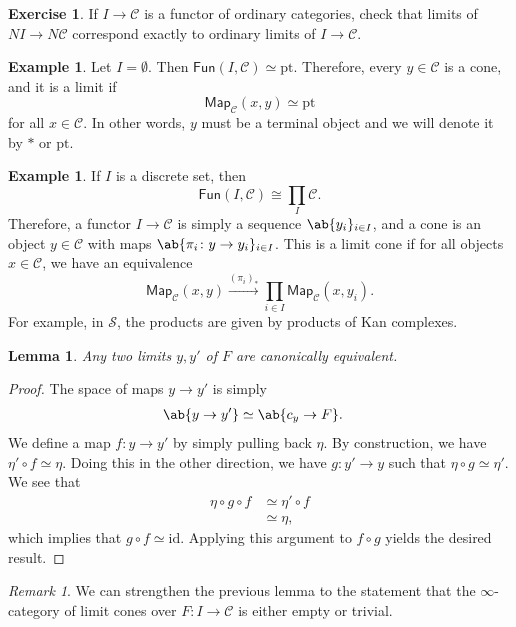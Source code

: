 \documentclass[10pt, oneside]{memoir}
\newtheorem{lem}[thm]{Lemma}
\theoremstyle{definition}
\newtheorem{exm}[thm]{Example}
\newtheorem{exer}[thm]{Exercise}
\theoremstyle{remark}
\newtheorem{rmk}[thm]{Remark}
\theoremstyle{plain}
\theoremstyle{definition}
\theoremstyle{remark}
\newcommand{\mc}[1]{\mathcal{#1}}
\newcommand{\mr}[1]{\mathrm{#1}}
\newcommand{\ms}[1]{\mathsf{#1}}
\newcommand{\1}{\mathbf{1}}
\newcommand{\2}{\mathbf{2}}
\newcommand{\3}{\mathbf{3}}
\begin{document}
\begin{exer}
    If $I \to \mc{C}$ is a functor of ordinary categories, check that limits of $NI \to N \mc{C}$ correspond exactly to ordinary limits of $I \to \mc{C}$.
\end{exer}

\begin{exm}
    Let $I = \emptyset$. Then $\ms{Fun}(I, \mc{C}) \simeq \mr{pt}$. Therefore, every $y \in \mc{C}$ is a cone, and it is a limit if
    \[ \ms{Map}_{\mc{C}}(x,y) \simeq \mr{pt} \]
    for all $x \in \mc{C}$. In other words, $y$ must be a terminal object and we will denote it by $*$ or $\mr{pt}$.
\end{exm}

\begin{exm}
    If $I$ is a discrete set, then 
    \[ \ms{Fun}(I, \mc{C}) \cong \prod_I \mc{C}. \]
    Therefore, a functor $I \to \mc{C}$ is simply a sequence $\ab\{y_i\}_{i \in I}$, and a cone is an object $y \in \mc{C}$ with maps $\ab\{\pi_i \colon y \to y_i \}_{i \in I}$. This is a limit cone if for all objects $x \in \mc{C}$, we have an equivalence
    \[ \ms{Map}_{\mc{C}}(x,y) \xrightarrow{(\pi_i)_*} \prod_{i \in I} \ms{Map}_{\mc{C}}(x, y_i). \]
    For example, in $\mc{S}$, the products are given by products of Kan complexes.
\end{exm}

\begin{lem}
    Any two limits $y, y'$ of $F$ are canonically equivalent.
\end{lem}

\begin{proof}
    The space of maps $y \to y'$ is simply
    \begin{align*}
        \ab\{ y\to y' \} &\simeq \ab\{c_y \to F \}.
    \end{align*}
    We define a map $f \colon y \to y'$ by simply pulling back $\eta$. By construction, we have $\eta' \circ f \simeq \eta$. Doing this in the other direction, we have $g \colon y' \to y$ such that $\eta \circ g \simeq \eta'$. We see that 
    \begin{align*}
        \eta \circ g \circ f &\simeq \eta' \circ f \\
        &\simeq \eta,
    \end{align*}
    which implies that $g \circ f \simeq \mr{id}$. Applying this argument to $f \circ g$ yields the desired result.
\end{proof}

\begin{rmk}
    We can strengthen the previous lemma to the statement that the $\infty$-category of limit cones over $F \colon I \to \mc{C}$ is either empty or trivial.
\end{rmk}
\end{document}
